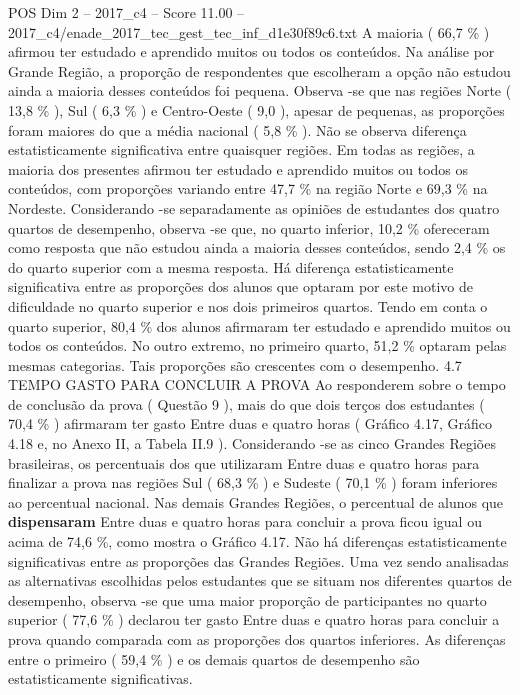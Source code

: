 \begin{textsample}{POS Dim 2 – 2017\_c4 – Score 11.00 – 2017\_c4/enade\_2017\_tec\_gest\_tec\_inf\_d1e30f89c6.txt}
A maioria ( 66,7 \% ) afirmou ter estudado e aprendido muitos ou todos os conteúdos.
Na análise por Grande Região, a proporção de respondentes que escolheram a opção não estudou ainda a maioria desses conteúdos foi pequena.
Observa -se que nas regiões Norte ( 13,8 \% ), Sul ( 6,3 \% ) e Centro-Oeste ( 9,0 ), apesar de pequenas, as proporções foram maiores do que a média nacional ( 5,8 \% ).
Não se observa diferença estatisticamente significativa entre quaisquer regiões.
Em todas as regiões, a maioria dos presentes afirmou ter estudado e aprendido muitos ou todos os conteúdos, com proporções variando entre 47,7 \% na região Norte e 69,3 \% na Nordeste.
Considerando -se separadamente as opiniões de estudantes dos quatro quartos de desempenho, observa -se que, no quarto inferior, 10,2 \% ofereceram como resposta que não estudou ainda a maioria desses conteúdos, sendo 2,4 \% os do quarto superior com a mesma resposta.
Há diferença estatisticamente significativa entre as proporções dos alunos que optaram por este motivo de dificuldade no quarto superior e nos dois primeiros quartos.
Tendo em conta o quarto superior, 80,4 \% dos alunos afirmaram ter estudado e aprendido muitos ou todos os conteúdos.
No outro extremo, no primeiro quarto, 51,2 \% optaram pelas mesmas categorias.
Tais proporções são crescentes com o desempenho. 4.7 TEMPO GASTO PARA CONCLUIR A PROVA Ao responderem sobre o tempo de conclusão da prova ( Questão 9 ), mais do que dois terços dos estudantes ( 70,4 \% ) afirmaram ter gasto Entre duas e quatro horas ( Gráfico 4.17, Gráfico 4.18 e, no Anexo II, a Tabela II.9 ).
Considerando -se as cinco Grandes Regiões brasileiras, os percentuais dos que utilizaram Entre duas e quatro horas para finalizar a prova nas regiões Sul ( 68,3 \% ) e Sudeste ( 70,1 \% ) foram inferiores ao percentual nacional.
Nas demais Grandes Regiões, o percentual de alunos que \textbf{dispensaram} Entre duas e quatro horas para concluir a prova ficou igual ou acima de 74,6 \%, como mostra o Gráfico 4.17.
Não há diferenças estatisticamente significativas entre as proporções das Grandes Regiões.
Uma vez sendo analisadas as alternativas escolhidas pelos estudantes que se situam nos diferentes quartos de desempenho, observa -se que uma maior proporção de participantes no quarto superior ( 77,6 \% ) declarou ter gasto Entre duas e quatro horas para concluir a prova quando comparada com as proporções dos quartos inferiores.
As diferenças entre o primeiro ( 59,4 \% ) e os demais quartos de desempenho são estatisticamente significativas.

\end{textsample}
